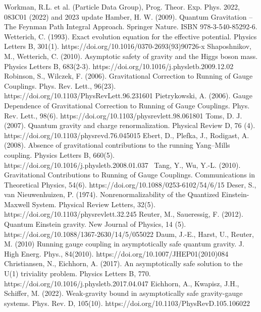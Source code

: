 \documentclass[11pt, a4paper]{article}
\begin{document}
\begin{thebibliography}{9}
    Workman, R.L. et al. (Particle Data Group), Prog. Theor. Exp. Phys. 2022, 083C01 (2022) and 2023 update
    Hamber, H. W. (2009). Quantum Gravitation – The Feynman Path Integral Approach. Springer Nature. ISBN 978-3-540-85292-6.
    Wetterich, C. (1993). Exact evolution equation for the effective potential. Physics Letters B, 301(1). https://doi.org/10.1016/0370-2693(93)90726-x 
    Shaposhnikov, M., Wetterich, C. (2010). Asymptotic safety of gravity and the Higgs boson mass. Physics Letters B, 683(2-3). https://doi.org/10.1016/j.physletb.2009.12.02    
    Robinson, S., Wilczek, F. (2006). Gravitational Correction to Running of Gauge Couplings. Phys. Rev. Lett., 96(23). https://doi.org/10.1103/PhysRevLett.96.231601
    Pietrykowski, A. (2006). Gauge Dependence of Gravitational Correction to Running of Gauge Couplings. Phys. Rev. Lett., 98(6). https://doi.org/10.1103/physrevlett.98.061801
    Toms, D. J. (2007). Quantum gravity and charge renormalization. Physical Review D, 76 (4). https://doi.org/10.1103/physrevd.76.045015
    Ebert, D., Plefka, J., Rodigast, A. (2008). Absence of gravitational contributions to the running Yang–Mills coupling. Physics Letters B, 660(5). https://doi.org/10.1016/j.physletb.2008.01.037 
    Tang, Y., Wu, Y.-L. (2010). Gravitational Contributions to Running of Gauge Couplings. Communications in Theoretical Physics, 54(6). https://doi.org/10.1088/0253-6102/54/6/15
    Deser, S., van Nieuwenhuizen, P. (1974). Nonrenormalizability of the Quantized Einstein-Maxwell System. Physical Review Letters, 32(5). https://doi.org/10.1103/physrevlett.32.245
    Reuter, M., Saueressig, F. (2012). Quantum Einstein gravity. New Journal of Physics, 14 (5). https://doi.org/10.1088/1367-2630/14/5/055022
    Daum, J.-E., Harst, U., Reuter, M. (2010) Running gauge coupling in asymptotically safe quantum gravity. J. High Energ. Phys., 84(2010). https://doi.org/10.1007/JHEP01(2010)084
    Christiansen, N., Eichhorn, A. (2017). An asymptotically safe solution to the U(1) triviality problem. Physics Letters B, 770. https://doi.org/10.1016/j.physletb.2017.04.047
    Eichhorn, A., Kwapisz, J.H., Schiffer, M. (2022). Weak-gravity bound in asymptotically safe gravity-gauge systems. Phys. Rev. D, 105(10). https://doi.org/10.1103/PhysRevD.105.106022
\end{thebibliography}
\end{document}
